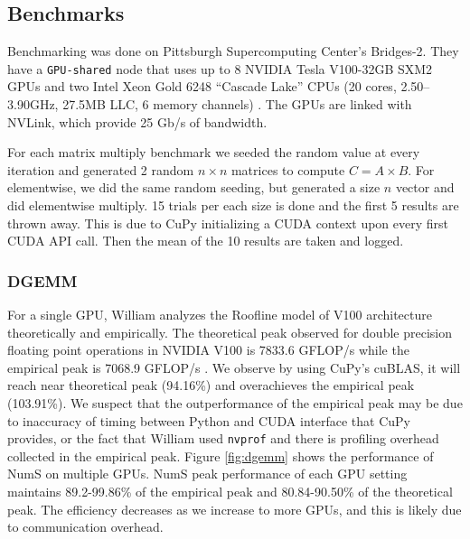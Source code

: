 \documentclass{article}
\begin{document}
\subsection{Benchmarks}
Benchmarking was done on Pittsburgh Supercomputing Center's Bridges-2. They have a \verb|GPU-shared| node that uses up to 8 NVIDIA Tesla V100-32GB SXM2 GPUs and two Intel Xeon Gold 6248 “Cascade Lake” CPUs (20 cores, 2.50–3.90GHz, 27.5MB LLC, 6 memory channels) \cite{psc}. The GPUs are linked with NVLink, which provide 25 Gb/s of bandwidth.

For each matrix multiply benchmark we seeded the random value at every iteration and generated 2 random $n \times n$ matrices to compute $C =  A \times B$. For elementwise, we did the same random seeding, but generated a size $n$ vector and did elementwise multiply. 15 trials per each size is done and the first 5 results are thrown away. This is due to CuPy initializing a CUDA context upon every first CUDA API call. Then the mean of the 10 results are taken and logged.

\subsubsection{DGEMM}
For a single GPU, William analyzes the Roofline model of V100 architecture theoretically and empirically. The theoretical peak observed for double precision floating point operations in NVIDIA V100 is 7833.6 GFLOP/s while the empirical peak is 7068.9 GFLOP/s \cite{roofline}. We observe by using CuPy's cuBLAS, it will reach near theoretical peak (94.16\%) and overachieves the empirical peak (103.91\%). We suspect that the outperformance of the empirical peak may be due to inaccuracy of timing between Python and CUDA interface that CuPy provides, or the fact that William used \verb|nvprof| and there is profiling overhead collected in the empirical peak. Figure \ref{fig:dgemm} shows the performance of NumS on multiple GPUs. NumS peak performance of each GPU setting maintains 89.2-99.86\% of the empirical peak and 80.84-90.50\% of the theoretical peak. The efficiency decreases as we increase to more GPUs, and this is likely due to communication overhead.
\end{document}
